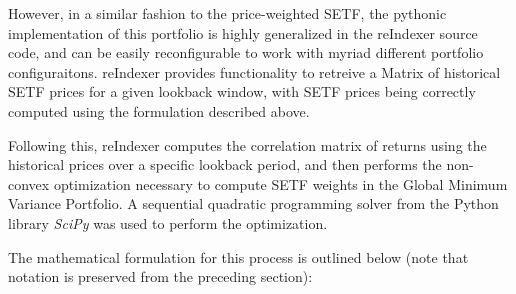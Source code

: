 \documentclass[../main.tex]{subfiles}
\begin{document}
However, in a similar fashion to the price-weighted SETF, the pythonic implementation of this portfolio is highly generalized in the reIndexer source code, and can be easily reconfigurable to work with myriad different portfolio configuraitons. reIndexer provides functionality to retreive a Matrix of historical SETF prices for a given lookback window, with SETF prices being correctly computed using the formulation described above.

Following this, reIndexer computes the correlation matrix of returns using the historical prices over a specific lookback period, and then performs the non-convex optimization necessary to compute SETF weights in the Global Minimum Variance Portfolio. A sequential quadratic programming solver from the Python library \textit{SciPy} was used to perform the optimization.

The mathematical formulation for this process is outlined below (note that notation is preserved from the preceding section):
\end{document}
